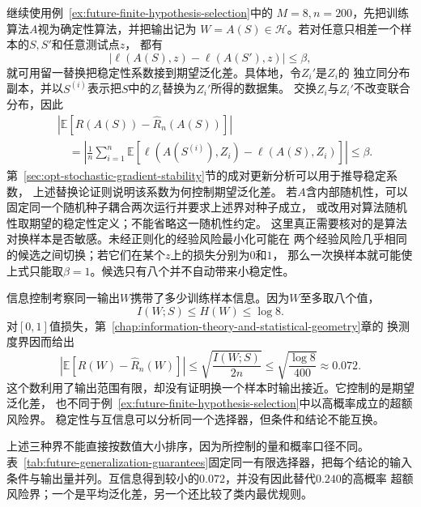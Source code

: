 \begin{example}[有限选择器的两类控制]
  \label{ex:future-stability-information-finite-selector}
  继续使用例~\ref{ex:future-finite-hypothesis-selection}中的
  \(M=8,n=200\)，先把训练算法\(A\)视为确定性算法，并把输出记为
  \(W=A(S)\in\mathcal H\)。若对任意只相差一个样本的\(S,S'\)和任意测试点\(z\)，
  都有
  \[
    \bigl|
      \ell(A(S),z)-\ell(A(S'),z)
    \bigr|
    \leq\beta,
  \]
  就可用留一替换把稳定性系数接到期望泛化差。具体地，令\(Z_i'\)是\(Z_i\)的
  独立同分布副本，并以\(S^{(i)}\)表示把\(S\)中的\(Z_i\)替换为\(Z_i'\)所得的数据集。
  交换\(Z_i\)与\(Z_i'\)不改变联合分布，因此
  \begin{align*}
    &\left|
      \mathbb{E}\!\left[
        R(A(S))-\widehat R_n(A(S))
      \right]
    \right|
    \\
    &\quad=
    \left|
      \frac1n\sum_{i=1}^n
      \mathbb{E}\!\left[
        \ell(A(S^{(i)}),Z_i)-\ell(A(S),Z_i)
      \right]
    \right|
    \leq\beta.
  \end{align*}
  第~\ref{sec:opt-stochastic-gradient-stability}节的成对更新分析可以用于推导稳定系数，
  上述替换论证则说明该系数为何控制期望泛化差。
  若\(A\)含内部随机性，可以固定同一个随机种子耦合两次运行并要求上述界对种子成立，
  或改用对算法随机性取期望的稳定性定义；不能省略这一随机性约定。
  这里真正需要核对的是算法对换样本是否敏感。未经正则化的经验风险最小化可能在
  两个经验风险几乎相同的候选之间切换；若它们在某个\(z\)上的损失分别为\(0\)和\(1\)，
  那么一次换样本就可能使上式只能取\(\beta=1\)。候选只有八个并不自动带来小稳定性。

  信息控制考察同一输出\(W\)携带了多少训练样本信息。因为\(W\)至多取八个值，
  \[
    I(W;S)\leq H(W)\leq\log 8.
  \]
  对\([0,1]\)值损失，第~\ref{chap:information-theory-and-statistical-geometry}章的
  换测度界因而给出
  \[
    \left|
      \mathbb{E}\!\left[
        R(W)-\widehat R_n(W)
      \right]
    \right|
    \leq
    \sqrt{\frac{I(W;S)}{2n}}
    \leq
    \sqrt{\frac{\log8}{400}}
    \approx0.072.
  \]
  这个数利用了输出范围有限，却没有证明换一个样本时输出接近。它控制的是期望泛化差，
  也不同于例~\ref{ex:future-finite-hypothesis-selection}中以高概率成立的超额风险界。
  稳定性与互信息可以分析同一个选择器，但条件和结论不能互换。
\end{example}

上述三种界不能直接按数值大小排序，因为所控制的量和概率口径不同。
表~\ref{tab:future-generalization-guarantees}固定同一有限选择器，把每个结论的输入
条件与输出量并列。互信息得到较小的$0.072$，并没有因此替代$0.240$的高概率
超额风险界；一个是平均泛化差，另一个还比较了类内最优规则。

